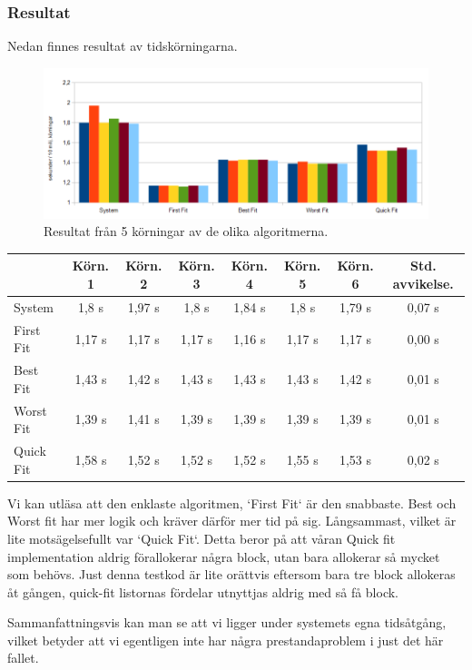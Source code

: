 \documentclass[a4paper,10pt,titlepage]{article}
\begin{document}
\subsubsection{Resultat}

Nedan finnes resultat av tidskörningarna.
\begin{figure}[H]
	\includegraphics[width=\textwidth]{time.png}
	\caption{Resultat från 5 körningar av de olika algoritmerna.}
\end{figure}
\begin{tabular}{| l | c | c | c | c | c | c | c |}
		\hline
		 & Körn. 1	& Körn. 2	& Körn. 3	& Körn. 4	& Körn. 5	& Körn. 6	& Std. avvikelse. \\
		\hline
		System		& 1,8 s			& 1,97 s	& 1,8 s		& 1,84 s	& 1,8 s		& 1,79 s	& 0,07 s \\
		First Fit	& 1,17 s		& 1,17 s	& 1,17 s	& 1,16 s	& 1,17 s	& 1,17 s	& 0,00 s \\
		Best Fit	& 1,43 s		& 1,42 s	& 1,43 s	& 1,43 s	& 1,43 s	& 1,42 s	& 0,01 s \\
		Worst Fit	& 1,39 s		& 1,41 s	& 1,39 s	& 1,39 s	& 1,39 s	& 1,39 s	& 0,01 s \\
		Quick Fit	& 1,58 s		& 1,52 s	& 1,52 s	& 1,52 s	& 1,55 s	& 1,53 s	& 0,02 s \\
		\hline
\end{tabular}

Vi kan utläsa att den enklaste algoritmen, `First Fit` är den snabbaste. Best och Worst fit har mer logik och kräver därför mer tid på sig. Långsammast, vilket är lite motsägelsefullt var `Quick Fit`. Detta beror på att våran Quick fit implementation aldrig förallokerar några block, utan bara allokerar så mycket som behövs. Just denna testkod är lite orättvis eftersom bara tre block allokeras åt gången, quick-fit listornas fördelar utnyttjas aldrig med så få block.


Sammanfattningsvis kan man se att vi ligger under systemets egna tidsåtgång, vilket betyder att vi egentligen inte har några prestandaproblem i just det här fallet.
\end{document}
